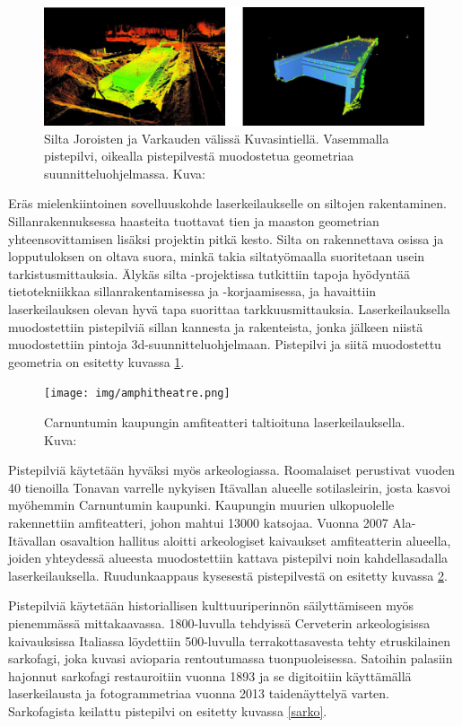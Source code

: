 \begin{figure}
    \centering
    \includegraphics[width=\textwidth]{img/silta.png}
    \caption{Silta Joroisten ja Varkauden välissä Kuvasintiellä. Vasemmalla pistepilvi, oikealla pistepilvestä muodostetua geometriaa suunnitteluohjelmassa. Kuva: \cite{silta}}
    \label{silt}
\end{figure}

Eräs mielenkiintoinen sovelluuskohde laserkeilaukselle on siltojen rakentaminen. Sillanrakennuksessa haasteita tuottavat tien ja maaston geometrian yhteensovittamisen lisäksi projektin pitkä kesto. Silta on rakennettava osissa ja lopputuloksen on oltava suora, minkä takia siltatyömaalla suoritetaan usein tarkistusmittauksia. Älykäs silta -projektissa tutkittiin tapoja hyödyntää tietotekniikkaa sillanrakentamisessa ja -korjaamisessa, ja havaittiin laserkeilauksen olevan hyvä tapa suorittaa tarkkuusmittauksia. Laserkeilauksella muodostettiin pistepilviä sillan kannesta ja rakenteista, jonka jälkeen niistä muodostettiin pintoja 3d-suunnitteluohjelmaan. Pistepilvi ja siitä muodostettu geometria on esitetty kuvassa \ref{silt}. \cite{silta}   

\begin{figure}
    \centering
    \texttt{[image: img/amphitheatre.png]}
    \caption{Carnuntumin kaupungin amfiteatteri taltioituna laserkeilauksella. Kuva: \cite{Amphitheatre}}
    \label{amfi}
\end{figure}

Pistepilviä käytetään hyväksi myös arkeologiassa. Roomalaiset perustivat vuoden 40 tienoilla Tonavan varrelle nykyisen Itävallan alueelle
sotilasleirin, josta kasvoi myöhemmin Carnuntumin kaupunki. Kaupungin muurien ulkopuolelle rakennettiin amfiteatteri, johon mahtui 13000 katsojaa.
Vuonna 2007 Ala-Itävallan osavaltion hallitus aloitti arkeologiset kaivaukset amfiteatterin alueella, joiden yhteydessä alueesta muodostettiin kattava pistepilvi noin kahdellasadalla laserkeilauksella. Ruudunkaappaus kysesestä pistepilvestä on esitetty kuvassa \ref{amfi}. \cite{Carnuntum}

Pistepilviä käytetään historiallisen kulttuuriperinnön säilyttämiseen myös pienemmässä mittakaavassa. 1800-luvulla tehdyissä Cerveterin arkeologisissa kaivauksissa Italiassa löydettiin 500-luvulla terrakottasavesta tehty etruskilainen sarkofagi, joka kuvasi avioparia rentoutumassa tuonpuoleisessa. Satoihin palasiin hajonnut sarkofagi restauroitiin vuonna 1893 ja se digitoitiin käyttämällä laserkeilausta ja fotogrammetriaa vuonna 2013 taidenäyttelyä varten. Sarkofagista keilattu pistepilvi on esitetty kuvassa \ref{sarko}. \cite{sarkofagi} 

